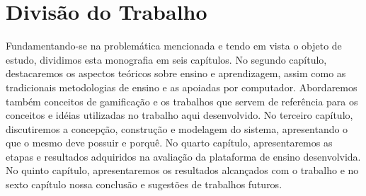 \section{Divisão do Trabalho}

Fundamentando-se na problemática mencionada e tendo em vista o objeto de estudo, dividimos esta monografia em seis capítulos. 
No segundo cap\'itulo, destacaremos os aspectos teóricos sobre ensino e aprendizagem, assim como as tradicionais metodologias de ensino e as apoiadas por computador. Abordaremos tamb\'em conceitos de gamificação e os trabalhos que servem de refer\^encia para os conceitos e id\'eias utilizadas no trabalho aqui desenvolvido. 
No terceiro capítulo, discutiremos a concepção, construção e modelagem do sistema, apresentando o que o mesmo deve possuir e porquê. No quarto capítulo, apresentaremos as etapas e resultados adquiridos na avaliação da plataforma de ensino desenvolvida. No quinto capítulo, apresentaremos os resultados alcan\c{c}ados com o trabalho e no sexto capítulo nossa conclusão e sugestões de trabalhos futuros. 